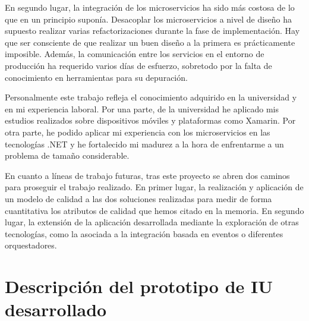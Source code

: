 \documentclass[11pt,spanish,listoffigures]{tfgetsinf}
\begin{document}
En segundo lugar, la integración de los microservicios ha sido más costosa de lo que en un principio suponía. Desacoplar los microservicios a nivel de diseño ha supuesto realizar varias refactorizaciones durante la fase de implementación. Hay que ser consciente de que realizar un buen diseño a la primera es prácticamente imposible. Además, la comunicación entre los servicios en el entorno de producción ha requerido varios días de esfuerzo, sobretodo por la falta de conocimiento en herramientas para su depuración.

Personalmente este trabajo refleja el conocimiento adquirido en la universidad y en mi experiencia laboral. Por una parte, de la universidad he aplicado mis estudios realizados sobre dispositivos móviles y plataformas como Xamarin. Por otra parte, he podido aplicar mi experiencia con los microservicios en las tecnologías .NET y he fortalecido mi madurez a la hora de enfrentarme a un problema de tamaño considerable.

En cuanto a líneas de trabajo futuras, tras este proyecto se abren dos caminos para proseguir el trabajo realizado. En primer lugar, la realización y aplicación de un modelo de calidad a las dos soluciones realizadas para medir de forma cuantitativa los atributos de calidad que hemos citado en la memoria. En segundo lugar, la extensión de la aplicación desarrollada mediante la exploración de otras tecnologías, como la asociada a la integración basada en eventos o diferentes orquestadores.


\renewcommand{\bibname}{Referencias}




\APPENDIX

%

\chapter{Descripción del prototipo de IU desarrollado} \label{ch:ModeloNavegacion}
\end{document}

